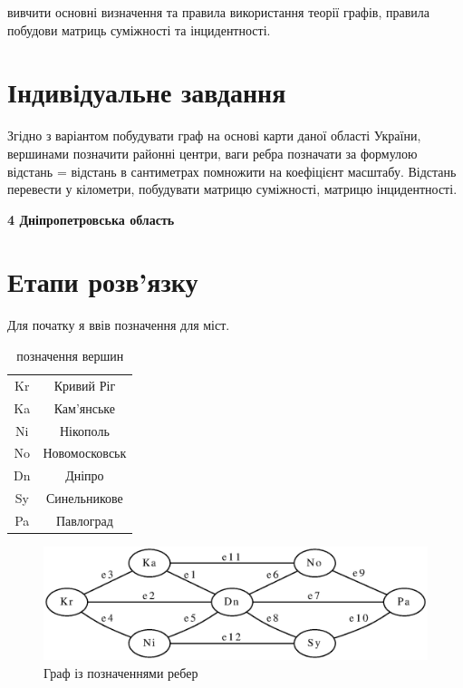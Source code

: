 \documentclass[a4paper, 12pt, oneside]{extarticle}
\begin{document}
\Margins



вивчити основні визначення та правила використання
теорії графів, правила побудови матриць суміжності та інцидентності.

\section*{Індивідуальне завдання}

Згідно з варіантом побудувати граф на основі карти даної області України,
вершинами позначити районні центри, ваги ребра позначати за формулою
відстань = відстань в сантиметрах помножити на коефіцієнт масштабу.
Відстань перевести у кілометри, побудувати матрицю суміжності, матрицю
інцидентності.

\textbf{4 Дніпропетровська область}

\section*{Етапи розв'язку}

Для початку я ввів позначення для міст.

\begin{table}[h]
	\centering
	\begin{tabular}{c|c}
		Kr & Кривий Ріг \\
		Ka & Кам'янське \\
		Ni & Нікополь \\
		No & Новомосковськ \\
		Dn & Дніпро \\
		Sy & Синельникове \\
		Pa & Павлоград \\
	\end{tabular}
	\caption{позначення вершин}
\end{table}

\begin{figure}[h]
	\centering
	\includegraphics[width=.7\textwidth]{edges}
	\caption{Граф із позначеннями ребер}
\end{figure}
\end{document}
